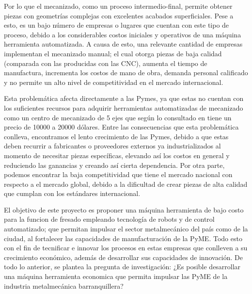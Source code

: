     Por lo que el mecanizado, como un proceso intermedio-final, permite obtener piezas con geometrías complejas con excelentes acabados superficiales. Pese a esto, es un bajo número de empresas o lugares que cuentan con este tipo de proceso, debido a los considerables costos iniciales y operativos de una máquina herramienta automatizada. A causa de esto, una relevante cantidad de empresas implementan el mecanizado manual; el cual otorga piezas de baja calidad (comparada con las producidas con las CNC), aumenta el tiempo de manufactura, incrementa los costos de mano de obra, demanda personal calificado y no permite un alto nivel de competitividad en el mercado internacional.
    
    Esta problemática afecta directamente a las Pymes, ya que estas no cuentan con los suficientes recursos para adquirir herramientas automatizadas de mecanizado como un centro de mecanizado de 5 ejes que según lo consultado en \citep{Alibaba2019} tiene un precio de 10000 a 20000 dólares.  Entre las consecuencias que esta problemática conlleva, encontramos el lento crecimiento de las Pymes, debido a que estas deben recurrir a fabricantes o proveedores externos ya industrializados al momento de necesitar piezas específicas, elevando así los costos en general y reduciendo las ganancias y creando así cierta dependencia. Por otra parte, podemos encontrar la baja competitividad que tiene el mercado nacional con respecto a el mercado global, debido a la dificultad de crear piezas de alta calidad que cumplan con los estándares internacional.
    
    El objetivo de este proyecto es proponer una máquina herramienta de bajo costo para la funcion de fresado empleando tecnología de robots y de control automatizado; que permitan impulsar el sector metalmecánico del país como de la ciudad, al fortalecer las capacidades de manufacturación de la PyME. Todo esto con el fin de tecnificar e innovar los procesos en estas empresas que conlleven a su crecimiento económico, además de desarrollar sus capacidades de innovación. De todo lo anterior, se plantea la pregunta de investigación: ¿Es posible desarrollar una máquina herramienta economica que permita impulsar las PyME de la industria metalmecánica barranquillera?
 \newpage
 
